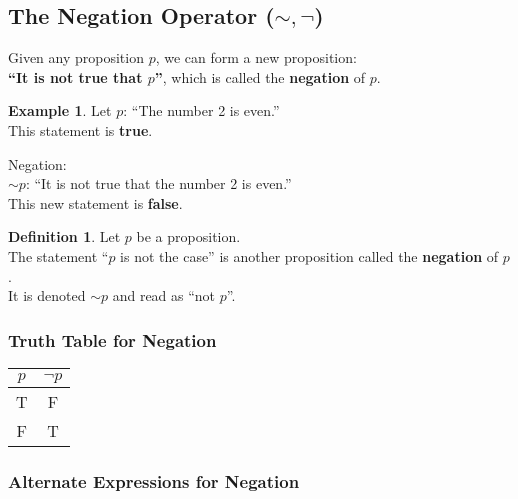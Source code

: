 \documentclass[
]{book}
\theoremstyle{definition}
\newtheorem{definition}{Definition}[chapter]
\theoremstyle{definition}
\newtheorem{example}{Example}[chapter]
\theoremstyle{definition}
\theoremstyle{definition}
\theoremstyle{remark}
\begin{document}
\subsection{\texorpdfstring{The Negation Operator (\(\sim,\neg\))}{The Negation Operator (\textbackslash sim,\textbackslash neg)}}\label{the-negation-operator-simneg}

Given any proposition \(p\), we can form a new proposition:\\
\textbf{``It is not true that \(p\)''}, which is called the \textbf{negation} of \(p\).

\begin{example}
\protect\hypertarget{exm:unnamed-chunk-12}{}\label{exm:unnamed-chunk-12}Let \(p\): ``The number 2 is even.''\\
This statement is \textbf{true}.

Negation:\\
\(\sim p\): ``It is not true that the number 2 is even.''\\
This new statement is \textbf{false}.
\end{example}

\begin{definition}
\protect\hypertarget{def:unnamed-chunk-13}{}\label{def:unnamed-chunk-13}Let \(p\) be a proposition.\\
The statement ``\(p\) is not the case'' is another proposition called the \textbf{negation} of \(p\).\\
It is denoted \(\sim p\) and read as ``not \(p\)''.
\end{definition}

\subsubsection{Truth Table for Negation}\label{truth-table-for-negation}

\begin{longtable}[]{@{}cc@{}}
\toprule\noalign{}
\(p\) & \(\neg p\) \\
\midrule\noalign{}
\endhead
\bottomrule\noalign{}
\endlastfoot
T & F \\
F & T \\
\end{longtable}

\subsubsection{Alternate Expressions for Negation}\label{alternate-expressions-for-negation}
\end{document}

